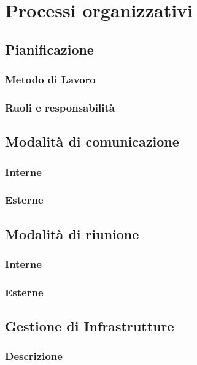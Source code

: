 \section{Processi organizzativi}
    \subsection{Pianificazione}
        \subsubsection{Metodo di Lavoro}
        \subsubsection{Ruoli e responsabilità}
    \subsection{Modalità di comunicazione}
        \subsubsection{Interne}
        \subsubsection{Esterne}

    \subsection{Modalità di riunione}
        \subsubsection{Interne}
        \subsubsection{Esterne}

    \subsection{Gestione di Infrastrutture}
        \subsubsection{Descrizione}
